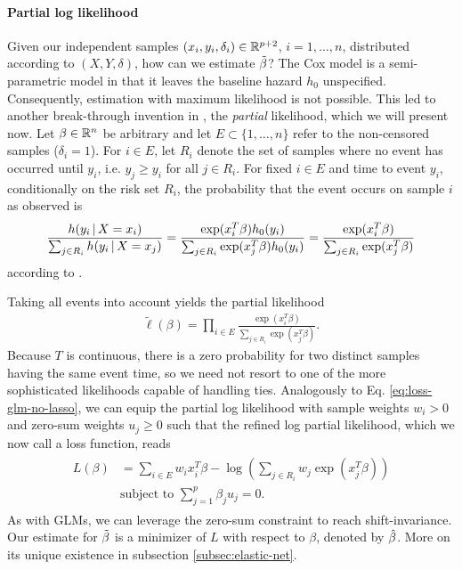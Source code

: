 \paragraph{Partial log likelihood}
Given our independent samples $(x_i, y_i, \delta_i) \in \mathbb{R}^{p+2}$, $i = 1, \ldots, n$, distributed 
according to $(X, Y, \delta)$, how can we estimate $\tilde{\beta}$? The Cox model is a semi-parametric 
model in that it leaves the baseline hazard $h_0$ unspecified. Consequently, estimation with maximum 
likelihood is not possible. This led to another break-through invention in \cite{cox72}, the 
\textit{partial} likelihood, which we will present now. Let $\beta \in \mathbb{R}^n$ be arbitrary and let 
$E \subset \{ 1, \ldots, n \}$ refer to the non-censored samples ($\delta_i = 1$). For $i \in E$, 
let $R_i$ denote the set of samples 
where no event has occurred until $y_i$, i.e. $y_j \geq y_i$ for all $j \in R_i$. For
fixed $i \in E$ and time to event $y_i$, conditionally on the risk set $R_i$, the probability that 
the event occurs on sample $i$ as observed is
\begin{align}
    \frac{h(y_i \,|\, X = x_i)}{\sum_{j \in R_i} h(y_i \,|\, X = x_j)} = 
    \frac{\exp(x_i^T \beta) h_0(y_i)}{\sum_{j \in R_i} \exp(x_j^T \beta) h_0(y_i)} = 
    \frac{\exp(x_i^T \beta)}{\sum_{j \in R_i} \exp(x_j^T \beta)}
\end{align}
according to \cite[Eq. (12)]{cox72}.

Taking all events into account yields the partial likelihood 
\begin{align}\label{eq:cox-partial-lh}
    \tilde{\ell}(\beta) = \prod_{i \in E} \frac{\exp(x_i^T \beta)}{\sum_{j \in R_i} \exp(x_j^T 
    \beta)}.
\end{align}
Because $T$ is continuous, there is a zero probability for two distinct samples having the same 
event time, so we need not resort to one of the more sophisticated likelihoods capable of handling ties.
Analogously to Eq. \eqref{eq:loss-glm-no-lasso}, we can equip the partial log likelihood with sample 
weights $w_i > 0$ and zero-sum weights $u_j \geq 0$ such that the refined log partial likelihood, 
which we now call a loss function, reads 
\begin{align}\label{eq:cox-log-lh}
\begin{split}
    L(\beta) &= \sum_{i \in E} w_i x_i^T \beta - \log \left( \sum_{j \in R_i} w_j \exp(x_j^T
    \beta) \right) \\
    & \text{subject to } \sum_{j=1}^p \beta_j u_j = 0.
\end{split}
\end{align}
As with GLMs, we can leverage the zero-sum constraint to reach shift-invariance. Our estimate 
for $\tilde{\beta}$ is a minimizer of $L$ with respect to $\beta$, denoted by $\hat{\beta}$. More on its 
unique existence in subsection \ref{subsec:elastic-net}.

